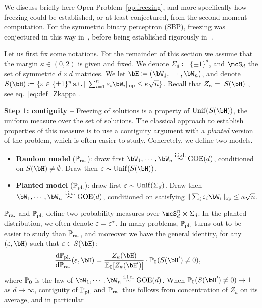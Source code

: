 We discuss briefly here Open Problem~\ref{op:freezing}, and more specifically how freezing could be established, 
or at least conjectured, from the second moment computation.
For the symmetric binary perceptron (SBP), freezing was conjectured in this way in~\cite{aubin2019storage}, before being established rigorously in~\cite{perkins2021frozen,abbe2022proof}.

\myskip 
Let us first fix some notations.
For the remainder of this section we assume that the margin $\kappa \in (0,2)$ is given and fixed.
We denote $\Sigma_d \coloneqq \{\pm 1\}^d$, and $\mcS_d$ the set of symmetric $d \times d$ matrices.
We let $\bH \coloneqq (\bW_1, \cdots, \bW_n)$, and denote $S(\bH) \coloneqq \{\eps \in \{\pm 1\}^n \, \textrm{s.t.} \, \|\sum_{i=1}^n \eps_i \bW_i\|_{\op} \leq \kappa \sqrt{n} \}$.
Recall that $Z_\kappa = |S(\bH)|$, see eq.~\eqref{eq:def_Zkappa}.

\myskip 
\textbf{Step 1: contiguity --}
Freezing of solutions is a property of $\Unif(S(\bH))$, the uniform measure over the set of solutions.
The classical approach to establish properties of this measure is to use a contiguity argument with a \emph{planted} version of the problem, 
which is often easier to study. Concretely, we define two models.
\begin{itemize}[leftmargin=*]
    \item \textbf{Random model} ($\mathbb{P}_{\mathrm{ra.}}$): draw first $\bW_1, \cdots, \bW_n \iid \GOE(d)$, conditioned on $S(\bH) \neq \emptyset$.
    Draw then $\eps \sim \Unif(S(\bH))$.
    \item \textbf{Planted model} ($\mathbb{P}_{\mathrm{pl.}}$): draw first $\varepsilon \sim \mathrm{Unif}(\Sigma_d)$. Draw then $\bW_1, \cdots, \bW_n \iid \GOE(d)$, conditioned on 
    satisfying $\|\sum_i \eps_i \bW_i\|_\op \leq \kappa \sqrt{n}$.
\end{itemize}
$\mathbb{P}_{\mathrm{ra.}}$ and $\mathbb{P}_{\mathrm{pl.}}$ define two probability measures over $\mcS_d^n \times \Sigma_d$. In the planted distribution, 
we often denote $\varepsilon = \varepsilon^\star$.
In many problems, $\mathbb{P}_{\mathrm{pl.}}$ turns out to be easier to study than $\mathbb{P}_{\mathrm{ra.}}$, and moreover we have the general identity, 
for any $(\eps, \bH)$ such that $\eps \in S(\bH)$:
\begin{align}\label{eq:planted_random}
    \frac{\rd \bbP_{\pl}}{\rd \bbP_{\ra}}(\eps, \bH) &= \frac{Z_\kappa(\bH)}{\EE_0[Z_\kappa(\bH')]} \cdot \bbP_0(S(\bH') \neq 0),
\end{align}
where $\mathbb{P}_0$ is the law of $\bW_1, \cdots, \bW_n \iid \GOE(d)$.
When $\bbP_0(S(\bH') \neq 0) \to 1$ as $d \to \infty$, contiguity of $\mathbb{P}_{\mathrm{pl.}}$ and $\mathbb{P}_{\mathrm{ra.}}$ thus follows from concentration of $Z_\kappa$ on its average, 
and in particular 



